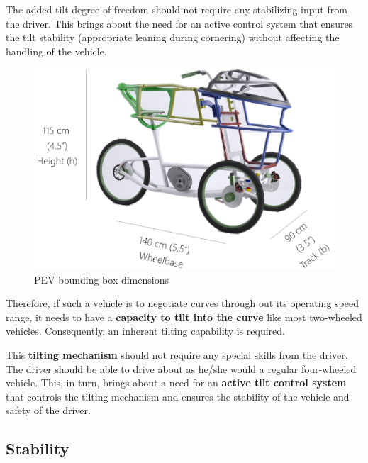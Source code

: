 The added tilt degree of freedom should not require any stabilizing input from the driver. This brings about the need for an active control system that ensures the tilt stability (appropriate leaning during cornering) without affecting the handling of the vehicle.

\begin{figure}[t]
	\includegraphics[width=1.0\linewidth]{figs/01/pev_6}
	\caption{PEV bounding box dimensions}
	\label{pevDim}
\end{figure}

Therefore, if such a vehicle is to negotiate curves through out its operating speed range, it needs to have a \textbf{capacity to tilt into the curve} like most two-wheeled vehicles. Consequently, an inherent tilting capability is required. 

This \textbf{tilting mechanism} should not require any special skills from the driver. The driver should be able to drive about as he/she would a regular four-wheeled vehicle. This, in turn, brings about a need for an \textbf{active tilt control system} that controls the tilting mechanism and ensures the stability of the vehicle and safety of the driver.


\subsection{Stability}


